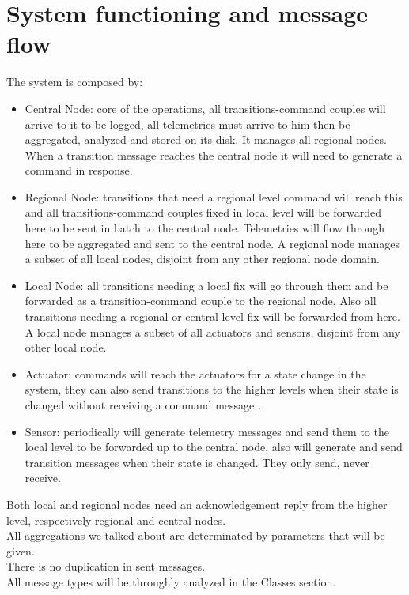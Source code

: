 \documentclass[11pt]{article}
\begin{document}
\section{System functioning and message flow}
The system is composed by:
\begin{itemize}
\item Central Node: core of the operations, all transitions-command couples will arrive to it to be logged, all telemetries must arrive to him then be aggregated, analyzed and stored on its disk. It manages all regional nodes. When a transition message reaches the central node it will need to generate a command in response.
\item Regional Node: transitions that need a regional level command will reach this and all transitions-command couples fixed in local level will be forwarded here to be sent in batch to the central node. Telemetries will flow through here to be aggregated and sent to the central node. A regional node manages a subset of all local nodes, disjoint from any other regional node domain.
\item Local Node: all transitions needing a local fix will go through them and be forwarded as a transition-command couple to the regional node. Also all transitions needing a regional or central level fix will be forwarded from here. A local node manages a subset of all actuators and sensors, disjoint from any other local node.
\item Actuator: commands will reach the actuators for a state change in the system, they can also send transitions to the higher levels when their state is changed without receiving a command message .
\item Sensor: periodically will generate telemetry messages and send them to the local level to be forwarded up to the central node, also will generate and send transition messages when their state is changed. They only send, never receive.
\end{itemize}
Both local and regional nodes need an acknowledgement reply from the higher level, respectively regional and central nodes. \\
All aggregations we talked about are determinated by parameters that will be given.\\
There is no duplication in sent messages.\\ 
All message types will be throughly analyzed in the Classes section.\\
\end{document}
